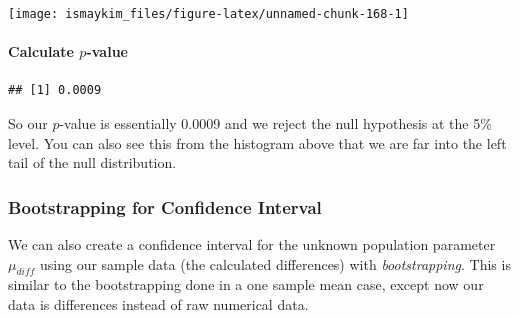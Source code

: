 \documentclass[]{tufte-book}
\newenvironment{Shaded}{\begin{snugshade}}{\end{snugshade}}
\newcommand{\KeywordTok}[1]{\textcolor[rgb]{0.13,0.29,0.53}{\textbf{{#1}}}}
\newcommand{\DataTypeTok}[1]{\textcolor[rgb]{0.13,0.29,0.53}{{#1}}}
\newcommand{\DecValTok}[1]{\textcolor[rgb]{0.00,0.00,0.81}{{#1}}}
\newcommand{\StringTok}[1]{\textcolor[rgb]{0.31,0.60,0.02}{{#1}}}
\newcommand{\OtherTok}[1]{\textcolor[rgb]{0.56,0.35,0.01}{{#1}}}
\newcommand{\NormalTok}[1]{{#1}}
\begin{document}
\begin{center}\texttt{[image: ismaykim\_files/figure-latex/unnamed-chunk-168-1]} \end{center}

\paragraph{\texorpdfstring{Calculate
\(p\)-value}{Calculate p-value}}\label{calculate-p-value-4}

\begin{Shaded}
\end{Shaded}

\begin{verbatim}
## [1] 0.0009
\end{verbatim}

So our \(p\)-value is essentially 0.0009 and we reject the null
hypothesis at the 5\% level. You can also see this from the histogram
above that we are far into the left tail of the null distribution.

\subsubsection{Bootstrapping for Confidence
Interval}\label{bootstrapping-for-confidence-interval-4}

We can also create a confidence interval for the unknown population
parameter \(\mu_{diff}\) using our sample data (the calculated
differences) with \emph{bootstrapping}. This is similar to the
bootstrapping done in a one sample mean case, except now our data is
differences instead of raw numerical data.

\begin{Shaded}
\end{Shaded}
\end{document}
